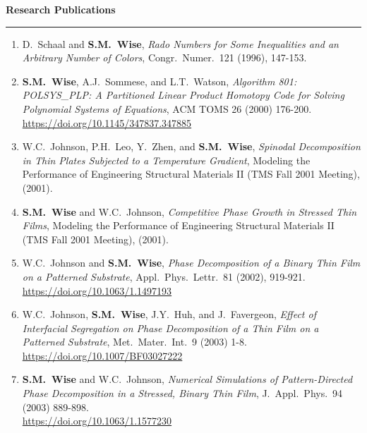 \documentclass[10pt,letterpaper]{article}
\newcommand{\cvsection}[1]{%
  \Needspace{5\baselineskip}\par\vspace{13pt}%
  {\color{Smokey}\fontsize{15}{17}\selectfont\bfseries #1}\par\vspace{3pt}%
  {\color{UTOrange}\rule{\linewidth}{1.8pt}}\par\vspace{4pt}%
}
\begin{document}
\cvsection{Research Publications}
    \begin{enumerate}

    \item
D.~Schaal and \textbf{S.M.~Wise}, {\sl Rado Numbers for Some Inequalities and an Arbitrary Number of Colors}, Congr.~Numer.~121 (1996), 147-153.

    \item
\textbf{S.M.~Wise}, A.J.~Sommese, and L.T.~Watson, {\sl Algorithm 801: POLSYS\_PLP: A Partitioned Linear Product Homotopy Code for Solving Polynomial Systems of Equations}, ACM TOMS 26 (2000) 176-200.
	\\
\url{https://doi.org/10.1145/347837.347885}

    \item
W.C.~Johnson, P.H.~Leo, Y.~Zhen, and \textbf{S.M.~Wise}, {\sl Spinodal Decomposition in Thin Plates Subjected to a Temperature Gradient}, Modeling the Performance of Engineering Structural Materials II (TMS Fall 2001 Meeting), (2001).

    \item
\textbf{S.M.~Wise} and W.C.~Johnson, {\sl Competitive Phase Growth in Stressed Thin Films}, Modeling the Performance of Engineering Structural Materials II (TMS Fall 2001 Meeting), (2001).

    \item
W.C.~Johnson and \textbf{S.M.~Wise}, {\sl Phase Decomposition of a Binary Thin Film on a Patterned Substrate}, Appl.~Phys.~Lettr.~81 (2002), 919-921.
	\\
\url{https://doi.org/10.1063/1.1497193}

    \item
W.C.~Johnson, \textbf{S.M.~Wise}, J.Y.~Huh, and J.~Favergeon, {\sl Effect of Interfacial Segregation on Phase Decomposition of a Thin Film on a Patterned Substrate}, Met.~Mater.~Int.~9 (2003) 1-8.
	\\
\url{https://doi.org/10.1007/BF03027222}

    \item
\textbf{S.M.~Wise} and W.C.~Johnson, {\sl Numerical Simulations of Pattern-Directed Phase Decomposition in a Stressed, Binary Thin Film}, J.~Appl.~Phys.~94 (2003) 889-898.
	\\
\url{https://doi.org/10.1063/1.1577230}


\end{enumerate}
\end{document}
